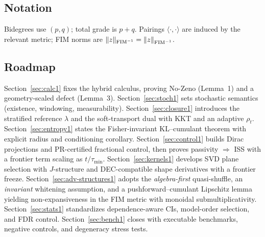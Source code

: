 \subsection*{Notation}
Bidegrees use $(p,q)$; total grade is $p+q$. Pairings $\langle\cdot,\cdot\rangle$ are induced by the relevant metric; FIM norms are $\|z\|_{\mathrm{FIM}^{-1}}=\left\|z\right\|_{\mathrm{FIM}^{-1}}$.

\subsection*{Roadmap}
Section~\ref{sec:calc1} fixes the hybrid calculus, proving No-Zeno (Lemma~1) and a geometry-scaled defect (Lemma~3). Section~\ref{sec:stoch1} sets stochastic semantics (existence, windowing, measurability). Section~\ref{sec:closure1} introduces the stratified reference $\lambda$ and the soft-transport dual with KKT and an adaptive $\rho_t$. Section~\ref{sec:entropy1} states the Fisher-invariant KL--cumulant theorem with explicit radius and conditioning corollary. Section~\ref{sec:control1} builds Dirac projections and PR-certified fractional control, then proves passivity $\Rightarrow$ ISS with a frontier term scaling as $t/\tau_{\min}$. Section~\ref{sec:kernels1} develops SVD plane selection with $J$-structure and DEC-compatible shape derivatives with a frontier freeze. Section~\ref{sec:adv-structures1} adopts the \emph{algebra-first} quasi-shuffle, an \emph{invariant} whitening assumption, and a pushforward--cumulant Lipschitz lemma yielding non-expansiveness in the FIM metric with monoidal submultiplicativity. Section~\ref{sec:stats1} standardizes dependence-aware CIs, model-order selection, and FDR control. Section~\ref{sec:bench1} closes with executable benchmarks, negative controls, and degeneracy stress tests.

